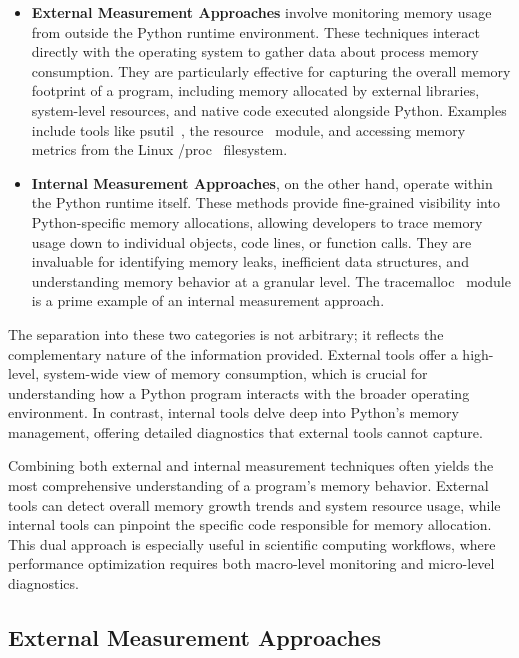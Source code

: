 \begin{itemize}
    \item \textbf{External Measurement Approaches}
    involve monitoring memory usage from outside the Python runtime environment.
    These techniques interact directly with the operating system to gather data about process memory consumption.
    They are particularly effective for capturing the overall memory footprint of a program, including memory allocated by external libraries, system-level resources, and native code executed alongside Python.
    Examples include tools like psutil~\cite{psutil}, the resource~\cite{importlib_resources} module, and accessing memory metrics from the Linux /proc~\cite{procfs} filesystem.

    \item \textbf{Internal Measurement Approaches},
    on the other hand, operate within the Python runtime itself.
    These methods provide fine-grained visibility into Python-specific memory allocations, allowing developers to trace memory usage down to individual objects, code lines, or function calls.
    They are invaluable for identifying memory leaks, inefficient data structures, and understanding memory behavior at a granular level.
    The tracemalloc~\cite{tracemalloc} module is a prime example of an internal measurement approach.
\end{itemize}

The separation into these two categories is not arbitrary; it reflects the complementary nature of the information provided.
External tools offer a high-level, system-wide view of memory consumption, which is crucial for understanding how a Python program interacts with the broader operating environment.
In contrast, internal tools delve deep into Python’s memory management, offering detailed diagnostics that external tools cannot capture.

Combining both external and internal measurement techniques often yields the most comprehensive understanding of a program’s memory behavior.
External tools can detect overall memory growth trends and system resource usage, while internal tools can pinpoint the specific code responsible for memory allocation.
This dual approach is especially useful in scientific computing workflows, where performance optimization requires both macro-level monitoring and micro-level diagnostics.

\subsection{External Measurement Approaches}
\label{subsec:mmc-external-measurement-approaches}

